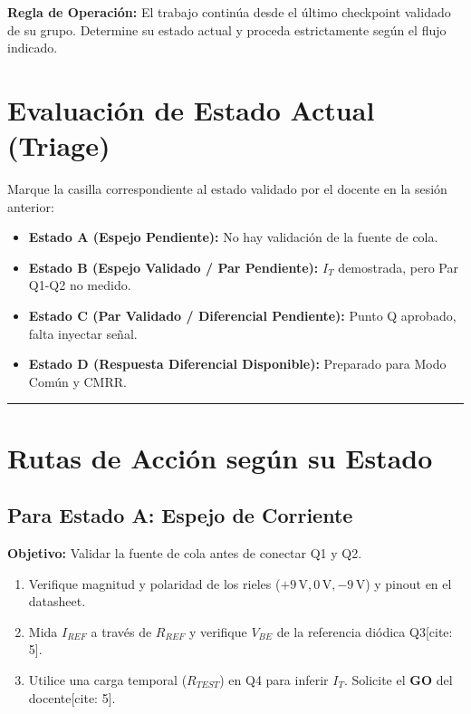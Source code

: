 \documentclass[11pt, a4paper]{article}
\begin{document}
\begin{tcolorbox}[colback=ucbblue!5, colframe=ucbblue, title=\textbf{Guía de Laboratorio: Checkpoints Diferenciados (Hito 2)}]
    \textbf{Regla de Operación:} El trabajo continúa desde el último checkpoint validado de su grupo. Determine su estado actual y proceda estrictamente según el flujo indicado.
\end{tcolorbox}

\section*{Evaluación de Estado Actual (Triage)}
Marque la casilla correspondiente al estado validado por el docente en la sesión anterior:
\begin{itemize}
    \item[$\square$] \textbf{Estado A (Espejo Pendiente):} No hay validación de la fuente de cola.
    \item[$\square$] \textbf{Estado B (Espejo Validado / Par Pendiente):} $I_T$ demostrada, pero Par Q1-Q2 no medido.
    \item[$\square$] \textbf{Estado C (Par Validado / Diferencial Pendiente):} Punto Q aprobado, falta inyectar señal.
    \item[$\square$] \textbf{Estado D (Respuesta Diferencial Disponible):} Preparado para Modo Común y CMRR.
\end{itemize}

\vspace{0.3cm}
\hrule
\vspace{0.3cm}

\section*{Rutas de Acción según su Estado}

\subsection*{Para Estado A: Espejo de Corriente}
\textbf{Objetivo:} Validar la fuente de cola antes de conectar Q1 y Q2.
\begin{enumerate}
    \item Verifique magnitud y polaridad de los rieles ($+9\,\text{V}, 0\,\text{V}, -9\,\text{V}$) y pinout en el datasheet.
    \item Mida $I_{REF}$ a través de $R_{REF}$ y verifique $V_{BE}$ de la referencia diódica Q3[cite: 5].
    \item Utilice una carga temporal ($R_{TEST}$) en Q4 para inferir $I_T$. Solicite el \textbf{GO} del docente[cite: 5].
\end{enumerate}
\end{document}

